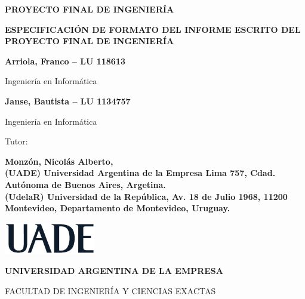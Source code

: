 \begin{titlepage}
    \centering

    {\textbf{\fontsize{18}{20}\selectfont PROYECTO FINAL DE INGENIERÍA} \par}
    \vspace{1.5cm}

    {\textbf{\fontsize{16}{18}\selectfont ESPECIFICACIÓN DE FORMATO DEL INFORME ESCRITO DEL PROYECTO FINAL DE INGENIERÍA} \par}
    \vspace{0.5cm}

    {\textbf{\fontsize{14}{16}\selectfont Arriola, Franco -- LU 118613} \par}
    {\fontsize{14}{16}\selectfont Ingeniería en Informática \par}
    \vspace{1cm}

    {\textbf{\fontsize{14}{16}\selectfont Janse, Bautista -- LU 1134757} \par}
    {\fontsize{14}{16}\selectfont Ingeniería en Informática \par}
    \vspace{1.5cm}

    {\fontsize{14}{16}\selectfont Tutor: \par}
    {\textbf{\fontsize{14}{16}\selectfont Monzón, Nicolás Alberto,
		\\ (UADE) Universidad Argentina de la Empresa Lima 757, Cdad. Autónoma de Buenos Aires, Argetina.
		\\ (UdelaR) Universidad de la República, Av. 18 de Julio 1968, 11200 Montevideo, Departamento de Montevideo, Uruguay.
			} \par}
    \vspace{3cm}

	{\textbf{\fontsize{14}{16}\selectfont \the\year} \par}
    \vspace{2cm}

    \includegraphics[width=0.30\textwidth]{./images/UADE}\par \vspace{1cm}
    {\textbf{\fontsize{14}{16}\selectfont UNIVERSIDAD ARGENTINA DE LA EMPRESA} \par}
    {\fontsize{14}{16}\selectfont FACULTAD DE INGENIERÍA Y CIENCIAS EXACTAS \par}
\end{titlepage}
